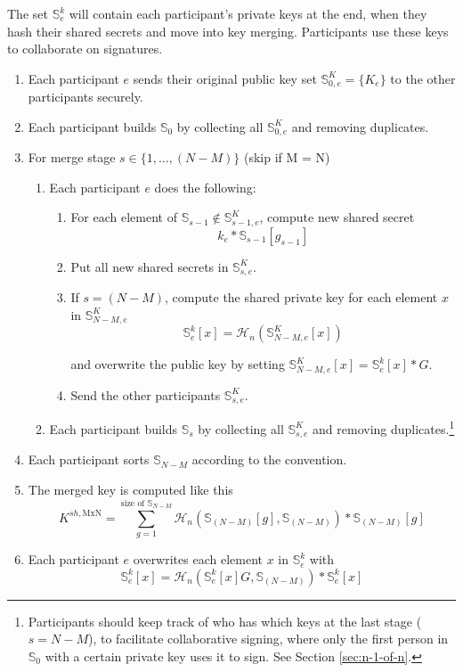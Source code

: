 The set $\mathbb{S}^k_{e}$ will contain each participant's private keys at the end, when they hash their shared secrets and move into key merging. Participants use these keys to collaborate on signatures.
\begin{enumerate}
    \item Each participant $e$ sends their original public key set $\mathbb{S}^K_{0,e} = \{K_e\}$ to the other participants securely.
    \item Each participant builds $\mathbb{S}_{0}$ by collecting all $\mathbb{S}^K_{0,e}$ and removing duplicates.
    \item For merge stage $s \in \{1,...,(N-M)\}$ (skip if M = N)
    \begin{enumerate}
        \item Each participant $e$ does the following:
        \begin{enumerate}
            \item For each element of $\mathbb{S}_{s-1} \notin \mathbb{S}^K_{s-1,e}$, compute new shared secret
            \[ k_e*\mathbb{S}_{s-1}[g_{s-1}] \]
            \item Put all new shared secrets in $\mathbb{S}^K_{s,e}$.
            \item If $s = (N-M)$, compute the shared private key for each element $x$ in $\mathbb{S}^K_{N-M,e}$
            \[ \mathbb{S}^k_{e}[x] = \mathcal{H}_n(\mathbb{S}^K_{N-M,e}[x]) \]
            
            and overwrite the public key by setting $\mathbb{S}^K_{N-M,e}[x] = \mathbb{S}^k_{e}[x]*G$.
            \item Send the other participants $\mathbb{S}^K_{s,e}$.
        \end{enumerate}
        \item Each participant builds $\mathbb{S}_{s}$ by collecting all $\mathbb{S}^K_{s,e}$ and removing duplicates.\footnote{Participants should keep track of who has which keys at the last stage ($s = N-M$), to facilitate collaborative signing, where only the first person in $\mathbb{S}_0$ with a certain private key uses it to sign. See Section \ref{sec:n-1-of-n}.}
    \end{enumerate}
    \item Each participant sorts $\mathbb{S}_{N-M}$ according to the convention.
    \item The merged key is computed like this
    \[K^{sh,\textrm{MxN}} = \sum^{\textrm{size of }\mathbb{S}_{N-M}}_{g = 1} \mathcal{H}_n(\mathbb{S}_{(N-M)}[g],\mathbb{S}_{(N-M)})*\mathbb{S}_{(N-M)}[g]\]
    \item Each participant $e$ overwrites each element $x$ in $\mathbb{S}^k_{e}$ with
    \[ \mathbb{S}^k_{e}[x] = \mathcal{H}_n(\mathbb{S}^k_{e}[x] G,\mathbb{S}_{(N-M)})*\mathbb{S}^k_{e}[x] \]
\end{enumerate}

